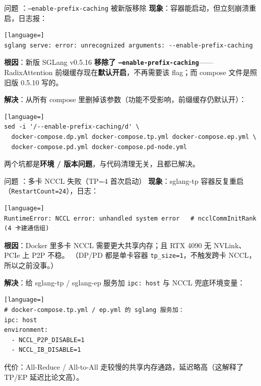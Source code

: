\documentclass[aspectratio=169,11pt]{beamer}
\newcommand{\gc}[1]{\texttt{\small #1}}   %
\newcommand{\cnum}[1]{\tikz[baseline=(c.base)]{\node[draw,circle,inner sep=1.2pt,line width=0.5pt](c){\scriptsize #1};}}
\begin{document}
\begin{frame}[fragile]{问题 \cnum{2}：\gc{--enable-prefix-caching} 被新版移除}
\textbf{现象}：容器能启动，但立刻崩溃重启，日志报：
\begin{lstlisting}[language=]
sglang serve: error: unrecognized arguments: --enable-prefix-caching
\end{lstlisting}
\textbf{根因}：新版 SGLang v0.5.16 \textbf{移除了 \gc{--enable-prefix-caching}}——RadixAttention 前缀缓存现在\textbf{默认开启}，不再需要该 flag；而 compose 文件是照旧版 0.5.10 写的。
\vspace{1mm}

\textbf{解决}：从所有 compose 里删掉该参数（功能不受影响，前缀缓存仍默认开）：
\begin{lstlisting}[language=]
sed -i '/--enable-prefix-caching/d' \
  docker-compose.dp.yml docker-compose.tp.yml docker-compose.ep.yml \
  docker-compose.pd.yml docker-compose.pd-node.yml
\end{lstlisting}
\centering\scriptsize
两个坑都是\textbf{环境 / 版本问题}，与代码清理无关，且都已解决。
\end{frame}

\begin{frame}[fragile]{问题 \cnum{3}：多卡 NCCL 失败（TP=4 首次启动）}
\textbf{现象}：sglang-tp 容器反复重启（\gc{RestartCount=24}），日志：
\begin{lstlisting}[language=]
RuntimeError: NCCL error: unhandled system error   # ncclCommInitRank (4 卡建通信组)
\end{lstlisting}
\textbf{根因}：Docker 里多卡 NCCL 需要更大共享内存；且 RTX 4090 无 NVLink、PCIe 上 P2P 不稳。
（DP/PD 都是单卡容器 \gc{tp\_size=1}，不触发跨卡 NCCL，所以之前没事。）
\vspace{1mm}

\textbf{解决}：给 sglang-tp / sglang-ep 服务加 \gc{ipc: host} 与 NCCL 兜底环境变量：
\begin{lstlisting}[language=]
# docker-compose.tp.yml / ep.yml 的 sglang 服务加：
ipc: host
environment:
  - NCCL_P2P_DISABLE=1
  - NCCL_IB_DISABLE=1
\end{lstlisting}
\centering\scriptsize
代价：All-Reduce / All-to-All 走较慢的共享内存通路，延迟略高（这解释了 TP/EP 延迟比论文高）。
\end{frame}
\end{document}
